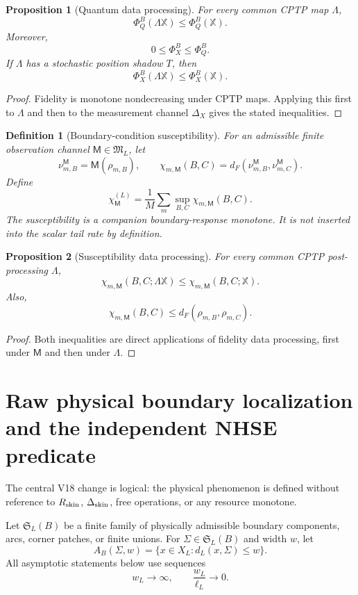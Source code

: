 \documentclass[11pt]{article}
\newtheorem{definition}{Definition}
\newtheorem{proposition}{Proposition}
\begin{document}
\begin{proposition}[Quantum data processing]
For every common CPTP map \(\Lambda\),
\[
\Phi_Q^B(\Lambda\mathbb X)\le \Phi_Q^B(\mathbb X).
\]
Moreover,
\[
0\le \Phi_X^B\le \Phi_Q^B.
\]
If \(\Lambda\) has a stochastic position shadow \(T\), then
\[
\Phi_X^B(\Lambda\mathbb X)\le\Phi_X^B(\mathbb X).
\]
\end{proposition}

\begin{proof}
Fidelity is monotone nondecreasing under CPTP maps. Applying this first to \(\Lambda\) and then to the measurement channel \(\Delta_X\) gives the stated inequalities.
\end{proof}

\begin{definition}[Boundary-condition susceptibility]
For an admissible finite observation channel \(\mathsf M\in\mathfrak M_L\), let
\[
\nu_{m,B}^{\mathsf M}=\mathsf M(\rho_{m,B}),
\qquad
\chi_{m,\mathsf M}(B,C)
=d_F(\nu_{m,B}^{\mathsf M},\nu_{m,C}^{\mathsf M}).
\]
Define
\[
\chi_{\mathsf M}^{(L)}
=
\frac1M\sum_m\sup_{B,C}\chi_{m,\mathsf M}(B,C).
\]
The susceptibility is a companion boundary-response monotone. It is not inserted into the scalar tail rate by definition.
\end{definition}

\begin{proposition}[Susceptibility data processing]
For every common CPTP post-processing \(\Lambda\),
\[
\chi_{m,\mathsf M}(B,C;\Lambda\mathbb X)
\le
\chi_{m,\mathsf M}(B,C;\mathbb X).
\]
Also,
\[
\chi_{m,\mathsf M}(B,C)
\le
 d_F(\rho_{m,B},\rho_{m,C}).
\]
\end{proposition}

\begin{proof}
Both inequalities are direct applications of fidelity data processing, first under \(\mathsf M\) and then under \(\Lambda\).
\end{proof}

\section{Raw physical boundary localization and the independent NHSE predicate}
\label{sec:physical}

The central V18 change is logical: the physical phenomenon is defined without reference to \(R_{\rm skin}\), \(\Delta_{\rm skin}\), free operations, or any resource monotone.

Let \(\mathfrak S_L(B)\) be a finite family of physically admissible boundary components, arcs, corner patches, or finite unions. For \(\Sigma\in\mathfrak S_L(B)\) and width \(w\), let
\[
A_B(\Sigma,w)=\{x\in X_L:d_L(x,\Sigma)\le w\}.
\]
All asymptotic statements below use sequences
\[
w_L\to\infty,
\qquad
\frac{w_L}{\ell_L}\to0.
\]
\end{document}
